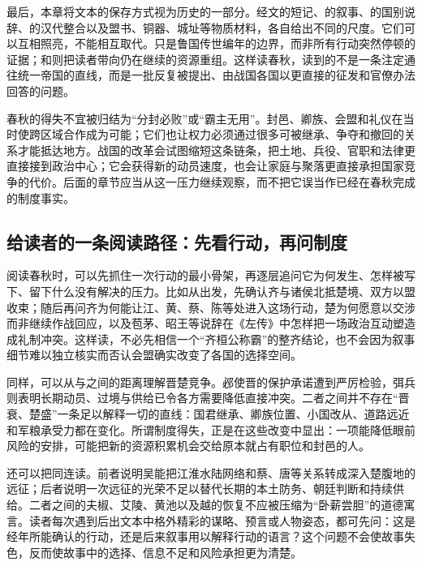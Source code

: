 最后，本章将文本的保存方式视为历史的一部分。经文的短记、的叙事、的国别说辞、的汉代整合以及盟书、铜器、城址等物质材料，各自给出不同的尺度。它们可以互相照亮，不能相互取代。只是鲁国传世编年的边界，而非所有行动突然停顿的证据；和则把读者带向仍在继续的资源重组。这样读春秋，读到的不是一条注定通往统一帝国的直线，而是一批反复被提出、由战国各国以更直接的征发和官僚办法回答的问题。

\begin{turningpoint}
春秋的得失不宜被归结为“分封必败”或“霸主无用”。封邑、卿族、会盟和礼仪在当时使跨区域合作成为可能；它们也让权力必须通过很多可被继承、争夺和撤回的关系才能抵达地方。战国的改革会试图缩短这条链条，把土地、兵役、官职和法律更直接接到政治中心；它会获得新的动员速度，也会让家庭与聚落更直接承担国家竞争的代价。后面的章节应当从这一压力继续观察，而不把它误当作已经在春秋完成的制度事实。
\end{turningpoint}

\subsection{给读者的一条阅读路径：先看行动，再问制度}

阅读春秋时，可以先抓住一次行动的最小骨架，再逐层追问它为何发生、怎样被写下、留下什么没有解决的压力。比如从出发，先确认齐与诸侯北抵楚境、双方以盟收束；随后再问齐为何能让江、黄、蔡、陈等处进入这场行动，楚为何愿意以交涉而非继续作战回应，以及苞茅、昭王等说辞在《左传》中怎样把一场政治互动塑造成礼制冲突。这样读，不必先相信一个“齐桓公称霸”的整齐结论，也不会因为叙事细节难以独立核实而否认会盟确实改变了各国的选择空间。

同样，可以从与之间的距离理解晋楚竞争。邲使晋的保护承诺遭到严厉检验，弭兵则表明长期动员、过境与供给已令各方需要降低直接冲突。二者之间并不存在“晋衰、楚盛”一条足以解释一切的直线：国君继承、卿族位置、小国改从、道路远近和军粮承受力都在变化。所谓制度得失，正是在这些改变中显出：一项能降低眼前风险的安排，可能把新的资源积累机会交给原本就占有职位和封邑的人。

还可以把同连读。前者说明吴能把江淮水陆网络和蔡、唐等关系转成深入楚腹地的远征；后者说明一次远征的光荣不足以替代长期的本土防务、朝廷判断和持续供给。二者之间的夫椒、艾陵、黄池以及越的恢复不应被压缩为“卧薪尝胆”的道德寓言。读者每次遇到后出文本中格外精彩的谋略、预言或人物姿态，都可先问：这是经年所能确认的行动，还是后来叙事用以解释行动的语言？这个问题不会使故事失色，反而使故事中的选择、信息不足和风险承担更为清楚。

